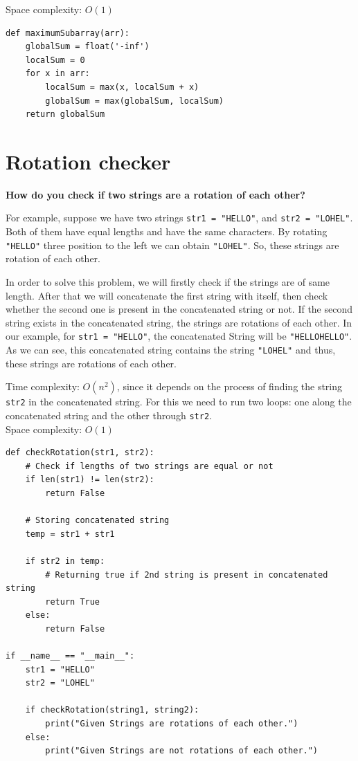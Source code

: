 \documentclass[a4paper,11pt]{book}
\begin{document}
\noindent Space complexity: $O(1)$

\begin{lstlisting}
def maximumSubarray(arr):
    globalSum = float('-inf')
    localSum = 0
    for x in arr:
        localSum = max(x, localSum + x)
        globalSum = max(globalSum, localSum)
    return globalSum
\end{lstlisting}

\newpage
\section{Rotation checker}
\textbf{How do you check if two strings are a rotation of each other?}
\vspace{5mm}

\noindent For example, suppose we have two strings \lstinline{str1 = "HELLO"}, and \lstinline{str2 = "LOHEL"}. Both of them have equal lengths and have the same characters. By rotating \lstinline{"HELLO"} three position to the left we can obtain \lstinline{"LOHEL"}. So, these strings are rotation of each other.

\noindent In order to solve this problem, we will firstly check if the strings are of same length. After that we will concatenate the first string with itself, then check whether the second one is present in the concatenated string or not. If the second string exists in the concatenated string, the strings are rotations of each other. In our example, for \lstinline{str1 = "HELLO"},  the concatenated String will be \lstinline{"HELLOHELLO"}. As we can see, this concatenated string contains the string \lstinline{"LOHEL"} and thus, these strings are rotations of each other.
\vspace{5mm}

\noindent Time complexity: $O(n^2)$, since it depends on the process of finding the string \lstinline{str2} in the concatenated string. For this we need to run two loops: one along the concatenated string and the other through \lstinline{str2}.\\

\noindent Space complexity: $O(1)$

\begin{lstlisting}
def checkRotation(str1, str2): 
    # Check if lengths of two strings are equal or not 
    if len(str1) != len(str2): 
        return False
  
    # Storing concatenated string 
    temp = str1 + str1 
  
    if str2 in temp:
        # Returning true if 2nd string is present in concatenated string
        return True 
    else: 
        return False
  
if __name__ == "__main__":
    str1 = "HELLO"
    str2 = "LOHEL"
      
    if checkRotation(string1, string2): 
        print("Given Strings are rotations of each other.")
    else: 
        print("Given Strings are not rotations of each other.")
\end{lstlisting}
\end{document}
